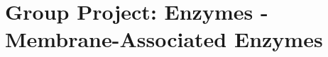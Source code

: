 \chapter{Group Project: Enzymes - Membrane-Associated Enzymes}
\setlength{\headheight}{12.71342pt}
\addtolength{\topmargin}{-0.71342pt}


